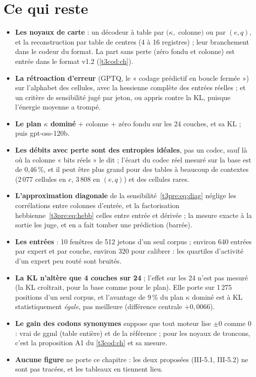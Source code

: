 \section{Ce qui reste}\label{t3pre:sec:reste}

\begin{itemize}
\item \textbf{Les noyaux de carte} : un décodeur à table par $(\kappa,$ colonne$)$ ou par $(e, q)$, et la reconstruction par table de centres (4 à 16 registres) ; leur branchement dans le codeur du format. La part sans perte (zéro fondu et colonne) est entrée dans le format v1.2 (\cref{t3cod:ch}).
\item \textbf{La rétroaction d'erreur} (GPTQ, le « codage prédictif en boucle fermée ») sur l'alphabet des cellules, avec la hessienne complète des entrées réelles ; et un critère de sensibilité jugé par jeton, ou appris contre la KL, puisque l'énergie moyenne a trompé.
\item \textbf{Le plan $\kappa$ dominé} + colonne + zéro fondu sur les 24 couches, et sa KL ; puis gpt-oss-120b.
\end{itemize}

\begin{faux}
\begin{itemize}
\item \textbf{Les débits avec perte sont des entropies idéales}, pas un codec, sauf là où la colonne « bits réels » le dit ; l'écart du codec réel mesuré sur la base est de 0,46\,\%, et il peut être plus grand pour des tables à beaucoup de contextes (2\,077 cellules en $e$, 3\,808 en $(e, q)$) et des cellules rares.
\item \textbf{L'approximation diagonale} de la sensibilité~\eqref{t3pre:eq:diag} néglige les corrélations entre colonnes d'entrée, et la factorisation hebbienne~\eqref{t3pre:eq:hebb} celles entre entrée et dérivée ; la mesure exacte à la sortie les juge, et en a fait tomber une prédiction (barrée).
\item \textbf{Les entrées} : 10 fenêtres de 512 jetons d'un seul corpus ; environ 640 entrées par expert et par couche, environ 320 pour calibrer : les quartiles d'activité d'un expert peu routé sont bruités.
\item \textbf{La KL n'altère que 4 couches sur 24} ; l'effet sur les 24 n'est pas mesuré (la KL croîtrait, pour la base comme pour le plan). Elle porte sur 1\,275 positions d'un seul corpus, et l'avantage de 9\,\% du plan $\kappa$ dominé est à KL statistiquement \emph{égale}, pas meilleure (différence centrale $+0{,}0066$).
\item \textbf{Le gain des codons synonymes} suppose que tout moteur lise $\pm0$ comme 0 : vrai de ggml (table entière) et de la référence ; pour les noyaux de troncons, c'est la proposition A1 du \cref{t3cod:ch} et sa mesure.
\item \textbf{Aucune figure} ne porte ce chapitre : les deux proposées (III-5.1, III-5.2) ne sont pas tracées, et les tableaux en tiennent lieu.
\end{itemize}
\end{faux}
